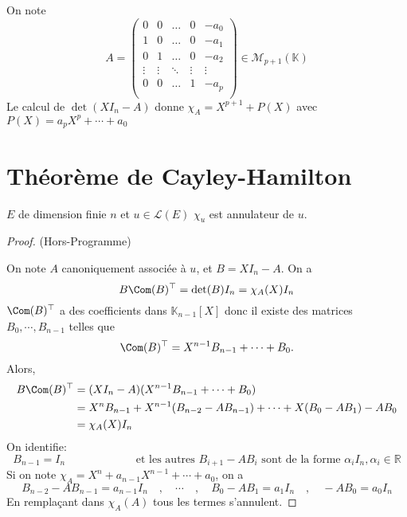 \begin{ex} On note \[
    A= \begin{pmatrix}
0 & 0 & \dots & 0 & -a_0 \\
1 & 0 & \dots & 0 & -a_1 \\
0 & 1 & \dots & 0 & -a_2 \\
\vdots & \vdots & \ddots & \vdots & \vdots \\
0 & 0 & \dots & 1 & -a_{p} \\
\end{pmatrix}\in \mathcal M_{p+1}(\mathbb K)
\]
Le calcul de $\det(XI_n-A)$ donne $\chi_A=X^{p+1}+P(X)$ avec $P(X)=a_pX^p+\cdots +a_0$
\end{ex}

\section{Théorème de Cayley-Hamilton}

\begin{thm}
    \Hyp $E$ de dimension finie $n$ et $u\in\mathcal L(E)$
    \Conc $\chi_u$ est annulateur de $u$.
\end{thm}

\begin{proof} (Hors-Programme)

    On note $A$ canoniquement associée à $u$, et $B=XI_n-A$. On a \[
        B\Com(B)^\top = \det(B)I_n=\chi_A(X)I_n
    \]
    $\Com(B)^\top$ a des coefficients dans $\mathbb K_{n-1}[X]$ donc il existe des matrices $B_0, \cdots, B_{n-1}$ telles que \[
        \Com(B)^\top=X^{n-1}B_{n-1}+\cdots +B_0.
    \]
    Alors, \begin{align*}
        B\Com(B)^\top&=(XI_n-A)(X^{n-1}B_{n-1}+\cdots +B_0)\\
                     &=X^nB_{n-1}+X^{n-1}(B_{n-2}-AB_{n-1})+\cdots + X(B_0-AB_1)-AB_0\\
                     &=\chi_A(X)I_n
    \end{align*}
    On identifie: \[
        B_{n-1}=I_n\qquad \qquad \qquad \text{ et les autres }B_{i+1}-AB_i\text{ sont de la forme }\alpha_i I_n, \alpha_i\in\mathbb R
    \]
    Si on note $\chi_A=X^n+a_{n-1}X^{n-1}+\cdots +a_0$, on a \[
        B_{n-2}-AB_{n-1}=a_{n-1}I_n\quad , \quad \cdots \quad,\quad B_0-AB_1=a_1 I_n\quad,\quad  -AB_0=a_0I_n
    \]
    En remplaçant dans $\chi_A(A)$ tous les termes s'annulent.
\end{proof}

